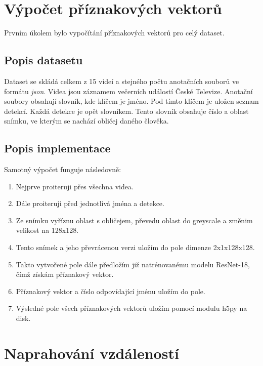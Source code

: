 \documentclass[11pt]{article}
\begin{document}
    \section{Výpočet příznakových vektorů}
    Prvním úkolem bylo vypočítání příznakových vektorů pro celý dataset.

    \subsection{Popis datasetu}
    Dataset se skládá celkem z 15 videí a stejného počtu anotačních souborů ve formátu \textit{json}.
    Videa jsou záznamem večerních událostí České Televize.
    Anotační soubory obsahují slovník, kde klíčem je jméno.
    Pod tímto klíčem je uložen seznam detekcí.
    Každá detekce je opět slovníkem.
    Tento slovník obsahuje číslo a oblast snímku, ve kterým se nachází obličej daného člověka.

    \subsection{Popis implementace}
    Samotný výpočet funguje následovně:
    \begin{enumerate}
        \item Nejprve proiteruji přes všechna videa.
        \item Dále proiteruji před jednotlivá jména a detekce.
        \item Ze snímku vyříznu oblast s obličejem, převedu oblast do greyscale a změnim velikost na 128x128.
        \item Tento snímek a jeho převrácenou verzi uložím do pole dimenze 2x1x128x128.
        \item Takto vytvořené pole dále předložím již natrénovanému modelu ResNet-18, čímž získám příznakový vektor.
        \item Příznakový vektor a číslo odpovídající jménu uložím do pole.
        \item Výsledné pole všech příznakových vektorů uložím pomocí modulu h5py na disk.
    \end{enumerate}

    \section{Naprahování vzdáleností}
\end{document}

